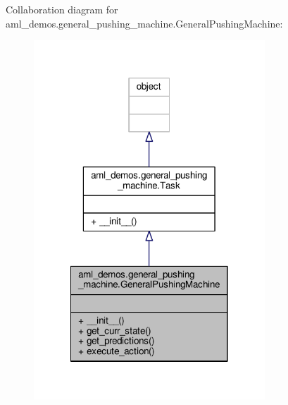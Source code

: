 Collaboration diagram for aml\-\_\-demos.\-general\-\_\-pushing\-\_\-machine.\-General\-Pushing\-Machine\-:
\nopagebreak
\begin{figure}[H]
\begin{center}
\leavevmode
\includegraphics[width=246pt]{classaml__demos_1_1general__pushing__machine_1_1_general_pushing_machine__coll__graph}
\end{center}
\end{figure}
